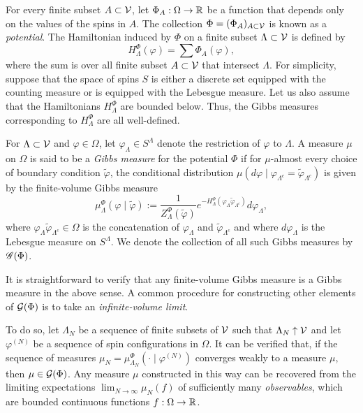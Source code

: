 For every finite subset $A \subset \mathcal{V}$, let $\Phi_A : \Omega \rightarrow {\mathbb R}$ be a function that
depends only on the values of the spins in $A$. The collection $\Phi = (\Phi_A)_{A\subset\mathcal{V}}$
is known as a \emph{potential}. The Hamiltonian induced by $\Phi$ on a finite
subset $\Lambda \subset \mathcal{V}$ is defined by
\begin{equation}
H^\Phi_\Lambda(\varphi) = \sum \Phi_A(\varphi),
\end{equation}
where the sum is over all finite subset $A \subset \mathcal{V}$ that intersect $\Lambda$.
For simplicity, suppose that the space of spins $S$ is either a discrete set equipped with the
counting measure or is equipped with the Lebesgue measure. Let us also assume that the Hamiltonians
$H^\Phi_\Lambda$ are bounded below. Thus, the  Gibbs measures corresponding to $H^\Phi_\Lambda$ are
all well-defined.

For $\Lambda \subset \mathcal{V}$ and $\varphi \in \Omega$, let $\varphi_\Lambda \in S^\Lambda$
denote the restriction of $\varphi$ to $\Lambda$.
A measure $\mu$ on $\Omega$ is said to be a \emph{Gibbs measure} for the potential $\Phi$
if for $\mu$-almost
every choice of boundary condition $\tilde\varphi$, the conditional distribution
$\mu(d\varphi \mid \varphi_{\Lambda^c} = \tilde\varphi_{\Lambda^c})$ is given by the finite-volume Gibbs
measure
\begin{equation}
\mu^\Phi_\Lambda(\varphi \mid \tilde\varphi)
  :=
\frac{1}{Z^\Phi_\Lambda(\tilde\varphi)}
e^{-H^\Phi_\Lambda(\varphi_\Lambda \tilde\varphi_{\Lambda^c})}
d\varphi_\Lambda,
\end{equation}
where $\varphi_\Lambda\tilde\varphi_{\Lambda^c} \in \Omega$ is the concatenation of
$\varphi_\Lambda$ and $\tilde\varphi_{\Lambda^c}$
and where $d\varphi_\Lambda$ is the Lebesgue measure on $S^\Lambda$.
We denote the collection of all such Gibbs measures by $\mathscr{G}(\Phi)$.

It is straightforward to verify that any finite-volume Gibbs measure is a Gibbs measure
in the above sense. A common procedure for constructing other elements of $\mathcal{G}(\Phi)$
is to take an \emph{infinite-volume limit}.

To do so, let $\Lambda_N$ be a sequence of finite subsets of $\mathcal{V}$ such that
$\Lambda_N \uparrow \mathcal{V}$
and let $\varphi^{(N)}$ be a sequence of spin configurations in $\Omega$. It can be verified
that, if the sequence of measures $\mu_N = \mu^\Phi_{\Lambda_N}(\cdot \mid \varphi^{(N)})$ converges weakly
to a measure $\mu$, then $\mu\in\mathcal{G}(\Phi)$. Any measure $\mu$ constructed in this way
can be recovered from the limiting expectations $\lim_{N\to\infty} \mu_N(f)$ of sufficiently
many \emph{observables}, which are bounded continuous functions $f : \Omega \rightarrow {\mathbb R}$.

